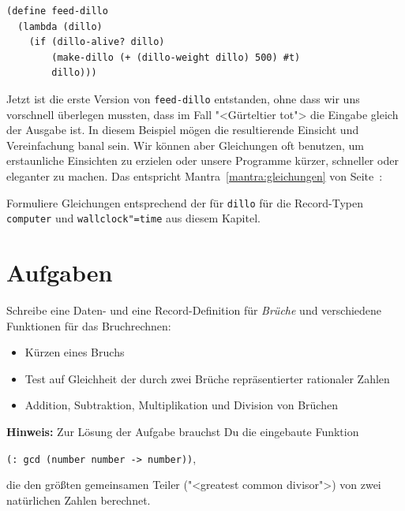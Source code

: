 \begin{verbatim}
(define feed-dillo
  (lambda (dillo)
    (if (dillo-alive? dillo)
        (make-dillo (+ (dillo-weight dillo) 500) #t)
        dillo)))
\end{verbatim}
%
Jetzt ist die erste Version von \texttt{feed-dillo} entstanden, ohne
dass wir uns vorschnell überlegen mussten, dass im Fall "<Gürteltier
tot"> die Eingabe gleich der Ausgabe ist.  In diesem Beispiel mögen die
resultierende Einsicht und Vereinfachung banal sein.  Wir können aber
Gleichungen oft benutzen, um erstaunliche Einsichten zu erzielen oder
unsere Programme kürzer, schneller oder eleganter zu machen.  Das
entspricht Mantra~\ref{mantra:gleichungen} von
Seite~\pageref{mantra:gleichungen}:
%
\mantragleichungen%

\begin{aufgabeinline}
  Formuliere Gleichungen entsprechend der für \texttt{dillo} für die
  Record-Typen \texttt{computer} und \texttt{wallclock"=time} aus
  diesem Kapitel.
\end{aufgabeinline}

\section*{Aufgaben}

\begin{aufgabe}
  Schreibe eine Daten- und eine
  Record-Definition für \textit{Brüche} und verschiedene Funktionen
  für das Bruchrechnen:
  \begin{itemize}
  \item Kürzen eines Bruchs
  \item Test auf Gleichheit der durch zwei Brüche repräsentierter
    rationaler Zahlen
  \item Addition, Subtraktion, Multiplikation und Division von
    Brüchen
  \end{itemize}
%
  \textbf{Hinweis:} Zur Lösung der Aufgabe brauchst Du die eingebaute
  Funktion
  \begin{center}
    \texttt{(: gcd (number number -> number))},
  \end{center}
  die den größten gemeinsamen Teiler ("<greatest common divisor">) von
  zwei natürlichen Zahlen berechnet.

\end{aufgabe}


